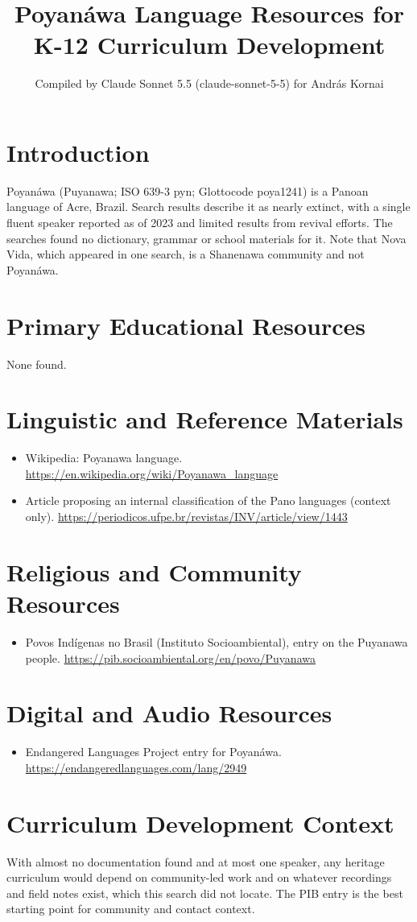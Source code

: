 \documentclass[12pt]{article}
\title{Poyan\'awa Language Resources for K-12 Curriculum Development}
\author{Compiled by Claude Sonnet 5.5 (claude-sonnet-5-5) for Andr\'as Kornai}
\date{}
\begin{document}
\maketitle

\section{Introduction}
Poyan\'awa (Puyanawa; ISO 639-3 pyn; Glottocode poya1241) is a Panoan language of Acre, Brazil. Search results describe it as nearly extinct, with a single fluent speaker reported as of 2023 and limited results from revival efforts. The searches found no dictionary, grammar or school materials for it. Note that Nova Vida, which appeared in one search, is a Shanenawa community and not Poyan\'awa.

\section{Primary Educational Resources}
None found.

\section{Linguistic and Reference Materials}
\begin{itemize}
\item Wikipedia: Poyanawa language. \url{https://en.wikipedia.org/wiki/Poyanawa_language}
\item Article proposing an internal classification of the Pano languages (context only). \url{https://periodicos.ufpe.br/revistas/INV/article/view/1443}
\end{itemize}

\section{Religious and Community Resources}
\begin{itemize}
\item Povos Ind\'igenas no Brasil (Instituto Socioambiental), entry on the Puyanawa people. \url{https://pib.socioambiental.org/en/povo/Puyanawa}
\end{itemize}

\section{Digital and Audio Resources}
\begin{itemize}
\item Endangered Languages Project entry for Poyan\'awa. \url{https://endangeredlanguages.com/lang/2949}
\end{itemize}

\section{Curriculum Development Context}
With almost no documentation found and at most one speaker, any heritage curriculum would depend on community-led work and on whatever recordings and field notes exist, which this search did not locate. The PIB entry is the best starting point for community and contact context.
\end{document}
